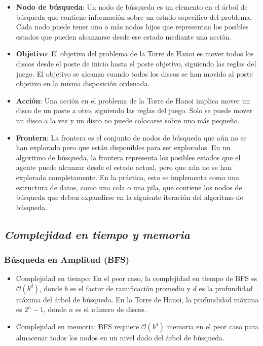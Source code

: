 \documentclass[a4paper,11pt]{article}
\begin{document}
\begin{itemize}
    \item \textbf{Nodo de búsqueda}: Un nodo de búsqueda es un elemento en el árbol de búsqueda que contiene información sobre un estado específico del problema. Cada nodo puede tener uno o más nodos hijos que representan los posibles estados que pueden alcanzarse desde ese estado mediante una acción.
    \item \textbf{Objetivo}: El objetivo del problema de la Torre de Hanoi es mover todos los discos desde el poste de inicio hasta el poste objetivo, siguiendo las reglas del juego. El objetivo se alcanza cuando todos los discos se han movido al poste objetivo en la misma disposición ordenada.
    \item \textbf{Acción}: Una acción en el problema de la Torre de Hanoi implica mover un disco de un poste a otro, siguiendo las reglas del juego. Solo se puede mover un disco a la vez y un disco no puede colocarse sobre uno más pequeño.
    \item \textbf{Frontera}: La frontera es el conjunto de nodos de búsqueda que aún no se han explorado pero que están disponibles para ser explorados. En un algoritmo de búsqueda, la frontera representa los posibles estados que el agente puede alcanzar desde el estado actual, pero que aún no se han explorado completamente. En la práctica, esto se implementa como una estructura de datos, como una cola o una pila, que contiene los nodos de búsqueda que deben expandirse en la siguiente iteración del algoritmo de búsqueda.
\end{itemize}


\subsection{\textit{Complejidad en tiempo y memoria}}

\subsubsection{Búsqueda en Amplitud (BFS)}
\begin{itemize}
    \item Complejidad en tiempo: En el peor caso, la complejidad en tiempo de BFS es $\mathcal{O}(b^d)$, donde $b$ es el factor de ramificación promedio y $d$ es la profundidad máxima del árbol de búsqueda. En la Torre de Hanoi, la profundidad máxima es $2^n-1$, donde $n$ es el número de discos.
    \item Complejidad en memoria: BFS requiere $\mathcal{O}(b^d)$ memoria en el peor caso para almacenar todos los nodos en un nivel dado del árbol de búsqueda.
\end{itemize}
\end{document}

